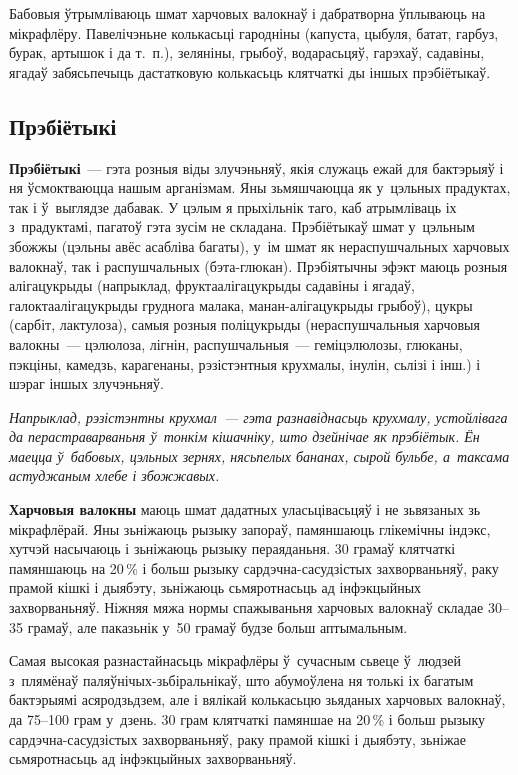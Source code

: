 Бабовыя ўтрымліваюць шмат харчовых валокнаў і дабратворна ўплываюць на мікрафлёру. Павелічэньне колькасьці гародніны (капуста, цыбуля, батат, гарбуз, бурак, артышок і да т.~п.), зеляніны, грыбоў, водарасьцяў, гарэхаў, садавіны, ягадаў забясьпечыць дастатковую колькасьць клятчаткі ды іншых прэбіётыкаў.


\subsection*{Прэбіётыкі}

\textbf{Прэбіётыкі}~--- гэта розныя віды злучэньняў, якія служаць ежай для бактэрыяў і ня ўсмоктваюцца нашым арганізмам. Яны зьмяшчаюцца як у~цэльных прадуктах, так і ў~выглядзе дабавак. У цэлым я прыхільнік таго, каб атрымліваць іх з~прадуктамі, пагатоў гэта зусім не складана. Прэбіётыкаў шмат у~цэльным збожжы (цэльны авёс асабліва багаты), у~ім шмат як нераспушчальных харчовых валокнаў, так і распушчальных (бэта-глюкан). Прэбіятычны эфэкт маюць розныя алігацукрыды (напрыклад, фруктаалігацукрыды садавіны і ягадаў, галоктаалігацукрыды груднога малака, манан-алігацукрыды грыбоў), цукры (сарбіт, лактулоза), самыя розныя поліцукрыды (нераспушчальныя харчовыя валокны~--- цэлюлоза, лігнін, распушчальныя~--- геміцэлюлозы, глюканы, пэкціны, камедзь, карагенаны, рэзістэнтныя крухмалы, інулін, сьлізі і інш.) і шэраг іншых злучэньняў.

\emph{Напрыклад, рэзістэнтны крухмал~--- гэта разнавіднасьць крухмалу, устойлівага да перастраварваньня ў~тонкім кішачніку, што дзейнічае як прэбіётык. Ён маецца ў~бабовых, цэльных зернях, нясьпелых бананах, сырой бульбе, а~таксама астуджаным хлебе і збожжавых.}

\textbf{Харчовыя валокны} маюць шмат дадатных уласьцівасьцяў і не зьвязаных зь мікрафлёрай. Яны зьніжаюць рызыку запораў, памяншаюць глікемічны індэкс, хутчэй насычаюць і зьніжаюць рызыку пераяданьня. 30 грамаў клятчаткі памяншаюць на 20\,\% і больш рызыку сардэчна-сасудзістых захворваньняў, раку прамой кішкі і дыябэту, зьніжаюць сьмяротнасьць ад інфэкцыйных захворваньняў. Ніжняя мяжа нормы спажываньня харчовых валокнаў складае 30--35 грамаў, але паказьнік у~50 грамаў будзе больш аптымальным.

Самая высокая разнастайнасьць мікрафлёры ў~сучасным сьвеце ў~людзей з~плямёнаў паляўнічых-зьбіральнікаў, што абумоўлена ня толькі іх багатым бактэрыямі асяродзьдзем, але і вялікай колькасьцю зьяданых харчовых валокнаў, да 75--100 грам у~дзень. 30 грам клятчаткі памяншае на 20\,\% і больш рызыку сардэчна-сасудзістых захворваньняў, раку прамой кішкі і дыябэту, зьніжае сьмяротнасьць ад інфэкцыйных захворваньняў.

